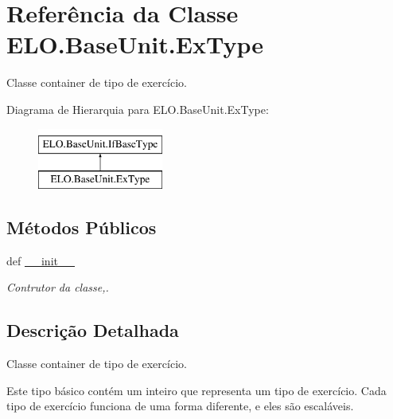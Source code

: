 \hypertarget{classELO_1_1BaseUnit_1_1ExType}{\section{Referência da Classe E\-L\-O.\-Base\-Unit.\-Ex\-Type}
\label{classELO_1_1BaseUnit_1_1ExType}
}


Classe container de tipo de exercício.  


Diagrama de Hierarquia para E\-L\-O.\-Base\-Unit.\-Ex\-Type\-:\begin{figure}[H]
\begin{center}
\leavevmode
\includegraphics[height=2.000000cm]{de/d96/classELO_1_1BaseUnit_1_1ExType}
\end{center}
\end{figure}
\subsection*{Métodos Públicos}
\begin{DoxyCompactItemize}
\item 
def \hyperlink{classELO_1_1BaseUnit_1_1ExType_aca9932deaf8fe247d16ce17909d3dfbf}{\-\_\-\-\_\-init\-\_\-\-\_\-}
\begin{DoxyCompactList}\small\item\em Contrutor da classe,. \end{DoxyCompactList}\end{DoxyCompactItemize}


\subsection{Descrição Detalhada}
Classe container de tipo de exercício. 

Este tipo básico contém um inteiro que representa um tipo de exercício. Cada tipo de exercício funciona de uma forma diferente, e eles são escaláveis. 

